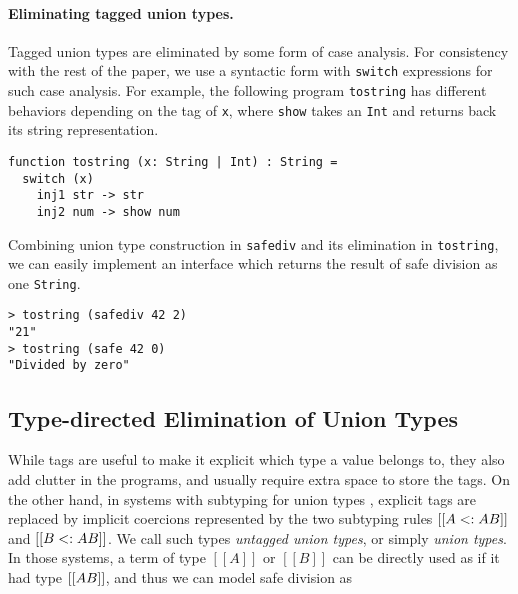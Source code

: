 \paragraph{Eliminating tagged union types.}
Tagged union types are eliminated by some form of case analysis.
For consistency with the rest of the paper, we use a syntactic form with
\lstinline{switch} expressions for such case analysis. For example,
the following program \lstinline{tostring} has different behaviors depending on the
tag of \lstinline{x}, where \lstinline{show} takes an \lstinline{Int} and
returns back its string representation.

\begin{lstlisting}
function tostring (x: String | Int) : String =
  switch (x)
    inj1 str -> str
    inj2 num -> show num
\end{lstlisting}

\noindent Combining union type construction in \lstinline{safediv} and its elimination in
\lstinline{tostring}, we can easily implement an interface which returns the
result of safe division as one \lstinline{String}.

\begin{lstlisting}
> tostring (safediv 42 2)
"21"
> tostring (safe 42 0)
"Divided by zero"
\end{lstlisting}


\subsection{Type-directed Elimination of Union Types}\label{subsec:elimination}





While tags are useful to make it explicit which type a value belongs to, they
also add clutter in the programs, and usually require extra space to store the
tags. On the other hand, in systems with subtyping for union types
\cite{dunfield2014elaborating,pierce1991programming,muehlboeck2018empowering},
explicit tags are replaced by implicit coercions represented by the two
subtyping rules $[[A <: A \/ B]]$ and $[[B <: A \/ B]]$. We call such types
\textit{untagged union types}, or simply \textit{union types}. In those systems,
a term of type $[[A]]$ or $[[B]]$ can be directly used as if it had type $[[A \/
B]]$, and thus we can model safe division as

